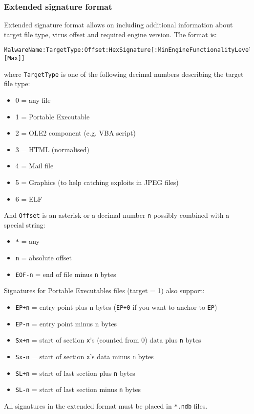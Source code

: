 \documentclass[a4paper,titlepage,12pt]{article}
\begin{document}
    \subsubsection{Extended signature format}
    Extended signature format allows on including additional information about
    target file type, virus offset and required engine version.
    The format is:
    \begin{verbatim}
MalwareName:TargetType:Offset:HexSignature[:MinEngineFunctionalityLevel:[Max]]
    \end{verbatim}
    where \verb+TargetType+ is one of the following decimal numbers describing
    the target file type:
    \begin{itemize}
	\item 0 = any file
	\item 1 = Portable Executable
	\item 2 = OLE2 component (e.g. VBA script)
	\item 3 = HTML (normalised)
	\item 4 = Mail file
	\item 5 = Graphics (to help catching exploits in JPEG files)
	\item 6 = ELF
    \end{itemize}
    And	\verb+Offset+ is an asterisk or a decimal number \verb+n+ possibly
    combined with a special string:
    \begin{itemize}
	\item \verb+*+ = any
	\item \verb+n+ = absolute offset
	\item \verb+EOF-n+ = end of file minus \verb+n+ bytes
    \end{itemize}
    Signatures for Portable Executables files (target = 1) also support:
    \begin{itemize}
	\item \verb#EP+n# = entry point plus n bytes (\verb#EP+0# if you
	want to anchor to \verb+EP+)
	\item \verb#EP-n# = entry point minus n bytes
	\item \verb#Sx+n# = start of section \verb+x+'s (counted from 0)
	data plus \verb+n+ bytes
	\item \verb#Sx-n# = start of section \verb+x+'s data minus \verb+n+ bytes
	\item \verb#SL+n# = start of last section plus \verb+n+ bytes
	\item \verb#SL-n# = start of last section minus \verb+n+ bytes
    \end{itemize}
    All signatures in the extended format must be placed in \verb+*.ndb+ files.
\end{document}
